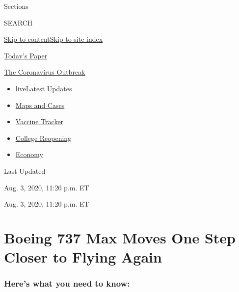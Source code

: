 Sections

SEARCH

\protect\hyperlink{site-content}{Skip to
content}\protect\hyperlink{site-index}{Skip to site index}

\href{https://myaccount.nytimes3xbfgragh.onion/auth/login?response_type=cookie\&client_id=vi}{}

\href{https://www.nytimes3xbfgragh.onion/section/todayspaper}{Today's
Paper}

\href{https://www.nytimes3xbfgragh.onion/news-event/coronavirus}{The
Coronavirus Outbreak}

\begin{itemize}
\tightlist
\item
  live\href{https://www.nytimes3xbfgragh.onion/2020/08/03/world/coronavirus-covid-19.html}{Latest
  Updates}
\item
  \href{https://www.nytimes3xbfgragh.onion/interactive/2020/us/coronavirus-us-cases.html}{Maps
  and Cases}
\item
  \href{https://www.nytimes3xbfgragh.onion/interactive/2020/science/coronavirus-vaccine-tracker.html}{Vaccine
  Tracker}
\item
  \href{https://www.nytimes3xbfgragh.onion/2020/08/02/us/covid-college-reopening.html}{College
  Reopening}
\item
  \href{https://www.nytimes3xbfgragh.onion/live/2020/08/03/business/stock-market-today-coronavirus}{Economy}
\end{itemize}

Last Updated

Aug. 3, 2020, 11:20 p.m. ET

Aug. 3, 2020, 11:20 p.m. ET

\hypertarget{boeing-737-max-moves-one-step-closer-to-flying-again}{%
\section{Boeing 737 Max Moves One Step Closer to Flying
Again}\label{boeing-737-max-moves-one-step-closer-to-flying-again}}

\hypertarget{heres-what-you-need-to-know}{%
\subsubsection{Here's what you need to
know:}\label{heres-what-you-need-to-know}}

